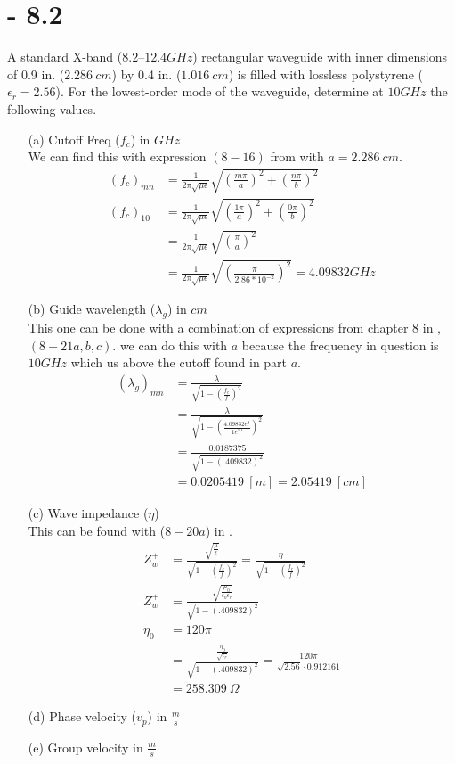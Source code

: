 \documentclass[12pt]{article}
\begin{document}
\section{- 8.2}
A standard X-band ($8.2–12.4 GHz$) rectangular waveguide with inner dimensions of 0.9 in. ($2.286\ cm$) by 0.4 in. ($1.016\ cm$) is filled with lossless polystyrene ($\epsilon_r = 2.56$). For the lowest-order mode of the waveguide, determine at $10 GHz$ the following values.
\begin{itemize}
\item[(a)] Cutoff Freq ($f_c$) in $GHz$\\
  We can find this with expression $(8-16)$ from \cite{balanis_2012} with $a = 2.286\ cm$.
  \begin{align*}
    (f_{c})_{mn} &= \frac{1}{2\pi\sqrt{\mu\epsilon}}\sqrt{\left(\frac{m\pi}{a}\right)^2 + \left(\frac{n\pi}{b}\right)^2}\\
    (f_{c})_{10}  &= \frac{1}{2\pi\sqrt{\mu\epsilon}}\sqrt{\left(\frac{1\pi}{a}\right)^2 + \left(\frac{0\pi}{b}\right)^2}\\
                 &= \frac{1}{2\pi\sqrt{\mu\epsilon}}\sqrt{\left(\frac{\pi}{a}\right)^2}\\
    &= \frac{1}{2\pi\sqrt{\mu\epsilon}}\sqrt{\left(\frac{\pi}{2.86*10^{-2}}\right)^2} = 4.09832 GHz
  \end{align*}
\item[(b)] Guide wavelength ($\lambda_g$) in $cm$\\
  This one can be done with a combination of expressions from chapter 8 in \cite{balanis_2012}, $(8-21a,b,c)$. we can do this with $a$ because the frequency in question is $10GHz$ which us above the cutoff found in part $a$.
  \begin{align*}
    (\lambda_g)_{mn} &= \frac{\lambda}{\sqrt{1-\left(\frac{f_c}{f}\right)^2}}\\
                     &= \frac{\lambda}{\sqrt{1-\left(\frac{4.09832e^{9}}{1e^{10}}\right)^2}}\\
                     &= \frac{0.0187375}{\sqrt{1-\left(.409832\right)^2}}\\
                     &= 0.0205419\ [m] = 2.05419\ [cm]
  \end{align*}
\item[(c)] Wave impedance ($\eta$)\\
  This can be found with ($8-20a$) in \cite{balanis_2012}.
  \begin{align*}
    Z_w^+ &= \frac{\sqrt{\frac{\mu}{\epsilon}}}{\sqrt{1-\left(\frac{f_c}{f}\right)^2}} = \frac{\eta}{\sqrt{1-\left(\frac{f_c}{f}\right)^2}}\\
    Z_w^+ &= \frac{\sqrt{\frac{\mu_0}{\epsilon_0\epsilon_r}}}{\sqrt{1-\left(.409832\right)^2}} \\
    \eta_0 &= 120\pi\\
          &= \frac{\frac{\eta_0}{\sqrt{\epsilon_r}}}{\sqrt{1-\left(.409832\right)^2}} = \frac{120\pi}{\sqrt{2.56}\cdot 0.912161}\\
    &= 258.309\ \Omega
  \end{align*}
\item[(d)] Phase velocity ($v_p$) in $\frac{m}{s}$
\item[(e)] Group velocity in $\frac{m}{s}$
\end{itemize}
\newpage
\end{document}
